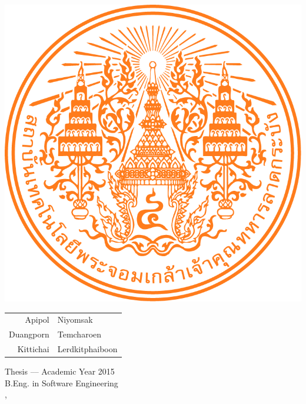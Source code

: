 \thispagestyle{empty}
\begin{center}

    \centering
    \includegraphics[width=0.3\linewidth]{res/kmitl_logo.png}
    \vspace{3cm}
    
    \Large\MakeUppercase{\dms}
    \vspace{2cm}
    
    {\Large 
    	\begin{tabular}{rl}
    		Apipol & Niyomsak \\
    		Duangporn & Temcharoen \\
    		Kittichai & Lerdkitphaiboon 
    	\end{tabular}
    \par}
    
    \vfill
    
    {\Large Thesis --– Academic Year 2015 \\
    B.Eng. in Software Engineering \\
    \IC, \kmitl\par}

\end{center}